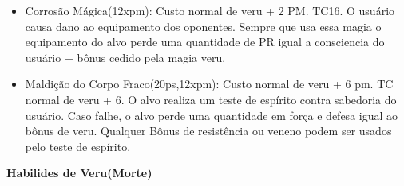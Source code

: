 \begin{itemize}
\item Corrosão Mágica(12xpm): Custo normal de veru  + 2 PM. TC16.\newline
O usuário causa dano ao equipamento dos oponentes. Sempre que usa essa magia o equipamento do alvo perde uma quantidade de PR igual a consciencia do usuário + bônus cedido pela magia veru.

	\item Maldição do Corpo Fraco(20ps,12xpm): Custo normal de veru + 6 pm. TC normal de veru + 6.\newline 
O alvo realiza um teste de espírito contra sabedoria do usuário. Caso falhe, o alvo perde uma quantidade em força e defesa igual ao bônus de veru. Qualquer Bônus de resistência ou veneno podem ser usados pelo teste de espírito.


\end{itemize}


\textbf{Habilides de Veru(Morte)}

